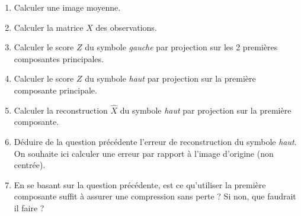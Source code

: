 \documentclass[solutions]{../exercices}
\begin{document}
\begin{exercice}
		\begin{enumerate}
			\item Calculer une image moyenne.
			\item Calculer la matrice $X$ des observations.
			\item Calculer le score $Z$ du symbole \textit{gauche} par projection sur les 2 premières composantes principales.
			\item Calculer le score $Z$ du symbole \textit{haut} par projection sur la première composante principale.
			\item Calculer la reconstruction $\hat{X}$ du symbole \textit{haut} par projection sur la première composante.
			\item Déduire de la question précédente l'erreur de reconstruction du symbole \textit{haut}. On souhaite ici calculer une erreur par rapport à l'image d'origine (non centrée).
			\item En se basant sur la question précédente, est ce qu'utiliser la première composante suffit à assurer une compression sans perte ? Si non, que faudrait il faire ?
		\end{enumerate}		
	\end{exercice}
\end{document}

